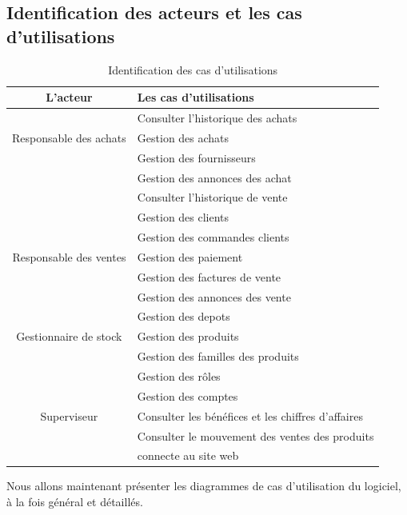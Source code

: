 \documentclass[edit,12pt,a4paper,ChapStyle,oneside,doubleinterligne]{report}
\begin{document}
\subsection{Identification des acteurs et les cas d'utilisations}
\begin{table}[h!]
    \centering
    \begin{tabular}{|c|l|}
    \hline
        L’acteur                  &  Les cas d’utilisations\\ \hline
                                  & Consulter l'historique des achats\\
        Responsable des achats    & Gestion des achats\\
                                  & Gestion des fournisseurs\\ 
                                  & Gestion des annonces  des achat\\\hline
                                  & Consulter l'historique de vente\\
                                  & Gestion des clients\\
                                  & Gestion des commandes clients\\
        Responsable des ventes    & Gestion des paiement\\
                                  & Gestion des factures de vente\\
                                  & Gestion des annonces des vente\\ \hline
                                  & Gestion des depots\\ 
         Gestionnaire de stock    & Gestion des produits\\
                                  & Gestion des familles des produits\\\hline
                                  & Gestion des rôles\\
                                  & Gestion des comptes \\ 
        Superviseur               & Consulter les bénéfices et les chiffres d'affaires\\
                                  & Consulter le mouvement des ventes des produits\\
                                  & connecte au site web  \\\hline
    \end{tabular}
    \caption{Identification des cas d’utilisations}
    \label{tab:Identification des cas d’utilisations}
\end{table}
Nous allons maintenant présenter les diagrammes de cas d'utilisation du logiciel, à la fois général et détaillés.
\newpage
\end{document}
